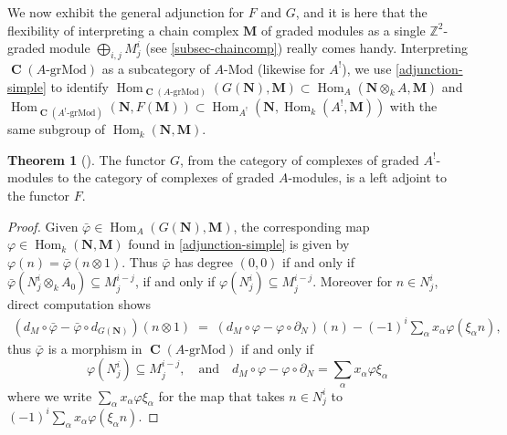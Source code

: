 \documentclass[a4paper]{article}
\theoremstyle{definition}
\newtheorem{theorem}[defn]{Theorem}
\theoremstyle{remark}
\newcommand{\grMod}{\ensuremath{\text{-grMod}}}
\newcommand{\Mod}{\ensuremath{\text{-Mod}}}
\DeclareMathOperator{\Hom}{\text{Hom}}
\DeclareMathOperator{\Ch}{\mathbf{C}}
\begin{document}
We now exhibit the general adjunction for \(F\) and \(G\), and it is here that
the flexibility of interpreting a chain complex \(\mathbf{M}\) of graded modules
as a single \(\mathbb{Z}^2\)-graded module \(\bigoplus_{i,j}M^i_j\) (see
\cref{subsec-chaincomp}) really comes handy.  Interpreting \(\Ch(A\grMod)\) as a
subcategory of \(A\Mod\) (likewise for \(A^!\)), we use \cref{adjunction-simple}
to identify \(\Hom_{\Ch(A\grMod)}(G(\mathbf{N}),\mathbf{M})\subset
\Hom_A(\mathbf{N}\otimes_k A, \mathbf{M})\) and
\(\Hom_{\Ch(A^!\grMod)}(\mathbf{N},F(\mathbf{M}))\subset \Hom_{A^!}(\mathbf{N},
\Hom_k(A^!,\mathbf{M}))\) with the same subgroup of
\(\Hom_k(\mathbf{N},\mathbf{M})\).

\begin{theorem}[] \label{adjunction}
    The functor \(G\), from the category of complexes of graded \(A^!\)-modules
    to the category of complexes of graded \(A\)-modules, is a left adjoint to
    the functor \(F\).
    \begin{proof}
        Given \(\bar{\varphi}\in \Hom_{A}(G(\mathbf{N}),
        \mathbf{M})\), the corresponding map \(\varphi\in
        \Hom_k(\mathbf{N},\mathbf{M})\) found in \cref{adjunction-simple} is
        given by \(\varphi(n)=\bar\varphi(n\otimes 1)\). Thus \(\bar\varphi\)
        has degree \((0,0)\) if and only if \(\bar\varphi(N^i_j \otimes_k A_0)
        \subseteq M^{i-j}_j\), if and only if \(\varphi(N^i_j)\subseteq
        M^{i-j}_j\).  Moreover for \(n\in N^i_j\), direct computation shows
        \begin{align*}
            (d_M \circ \bar\varphi - \bar\varphi \circ d_{G(\mathbf{N})}) (n
            \otimes 1) \; = \; (d_M \circ \varphi - \varphi \circ
            \partial_N) (n) - (-1)^i \sum_\alpha x_\alpha \varphi(\xi_\alpha n),
        \end{align*}
        thus \(\bar\varphi\) is a morphism in \(\Ch(A\grMod)\) if and only if
        \begin{equation}\label{adjunctcondition}
            \varphi(N^i_j)\subseteq M^{i-j}_j, \quad \text{and} \quad d_M\circ
            \varphi - \varphi \circ \partial_N = \sum_\alpha x_\alpha \varphi
            \xi_\alpha        
        \end{equation}
        where we write \(\sum_\alpha x_\alpha\varphi \xi_\alpha\) for the map
        that takes \(n\in N^i_j\) to \((-1)^i\sum_\alpha x_\alpha
        \varphi(\xi_\alpha n)\).


\end{proof}
\end{theorem}
\end{document}
